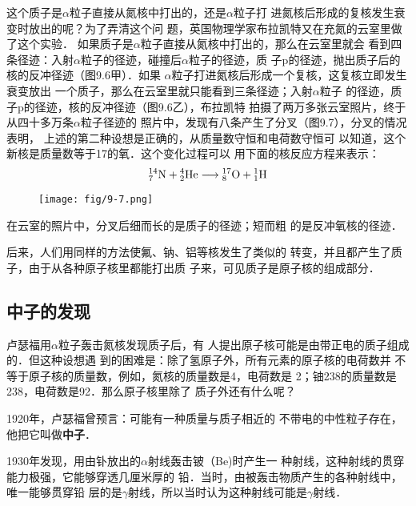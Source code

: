 这个质子是$\alpha$粒子直接从氮核中打出的，还是$\alpha$粒子打
进氮核后形成的复核发生衰变时放出的呢？为了弄清这个问
题，英国物理学家布拉凯特又在充氮的云室里做了这个实验．
如果质子是$\alpha$粒子直接从氮核中打出的，那么在云室里就会
看到四条径迹：入射$\alpha$粒子的径迹，碰撞后$\alpha$粒子的径迹，质
子p的径迹，抛出质子后的核的反冲径迹（图9.6甲）．如果
$\alpha$粒子打进氮核后形成一个复核，这复核立即发生衰变放出
一个质子，那么在云室里就只能看到三条径迹；入射$\alpha$粒子
的径迹，质子p的径迹，核的反冲径迹（图9.6乙），布拉凯特
拍摄了两万多张云室照片，终于从四十多万条$\alpha$粒子径迹的
照片中，发现有八条产生了分叉（图9.7），分叉的情况表明，
上述的第二种设想是正确的，从质量数守恒和电荷数守恒可
以知道，这个新核是质量数等于17的氧．这个变化过程可以
用下面的核反应方程来表示：
\[\atom{N}{14}{7}+\atom{He}{4}{2}\longrightarrow \atom{O}{17}{8}+\atom{H}{1}{1} \]
\begin{figure}[htp]\centering
\texttt{[image: fig/9-7.png]}
\caption{}
\end{figure}

在云室的照片中，分叉后细而长的是质子的径迹；短而粗
的是反冲氧核的径迹．

后来，人们用同样的方法使氟、钠、铝等核发生了类似的
转变，并且都产生了质子，由于从各种原子核里都能打出质
子来，可见质子是原子核的组成部分．

\subsection{中子的发现}

卢瑟福用$\alpha$粒子轰击氮核发现质子后，有
人提出原子核可能是由带正电的质子组成的．但这种设想遇
到的困难是：除了氢原子外，所有元素的原子核的电荷数并
不等于原子核的质量数，例如，氮核的质量数是4，电荷数是
2；铀238的质量数是238，电荷数是92．那么原子核里除了
质子外还有什么呢？

1920年，卢瑟福曾预言：可能有一种质量与质子相近的
不带电的中性粒子存在，他把它叫做\textbf{中子}．

1930年发现，用由钋放出的$\alpha$射线轰击铍（Be)时产生一
种射线，这种射线的贯穿能力极强，它能够穿透几厘米厚的
铅．当时，由被轰击物质产生的各种射线中，唯一能够贯穿铅
层的是$\gamma$射线，所以当时认为这种射线可能是$\gamma$射线．

